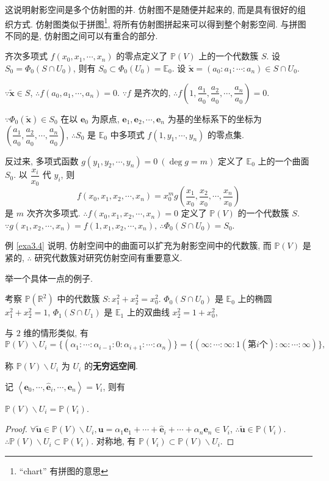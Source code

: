 \documentclass[color=black,device=normal,lang=cn,mode=geye]{elegantnote}
\begin{document}
这说明射影空间是多个仿射图的并. 仿射图不是随便并起来的, 而是具有很好的组织方式. 仿射图类似于拼图\footnote{``chart'' 有拼图的意思}, 将所有仿射图拼起来可以得到整个射影空间. 与拼图不同的是, 仿射图之间可以有重合的部分.
\begin{example}\label{exa3.4}
    齐次多项式 $f(x_0,x_1,\cdots,x_n)$ 的零点定义了 $\mathbb{P}(V)$ 上的一个代数簇 $S$. 设 $S_0=\Phi_0(S\cap U_0)$, 则有 $S_0\subset\Phi_0(U_0)=\mathbb{E}_0$. 设 $\tilde{\boldsymbol{x}}=(a_0:a_1:\cdots:a_n)\in S\cap U_0$.
    
    $\because\tilde{\boldsymbol{x}}\in S$, $\therefore f(a_0,a_1,\cdots,a_n)=0$. $\because f$ 是齐次的, $\therefore f\left(1,\dfrac{a_1}{a_0},\dfrac{a_2}{a_0},\cdots,\dfrac{a_n}{a_0}\right)=0$.
    
    $\because\Phi_0(\tilde{\boldsymbol{x}})\in S_0$ 在以 $\boldsymbol{e}_0$ 为原点, $\boldsymbol{e}_1,\boldsymbol{e}_2,\cdots,\boldsymbol{e}_n$ 为基的坐标系下的坐标为 $\left(\dfrac{a_1}{a_0},\dfrac{a_2}{a_0},\cdots,\dfrac{a_n}{a_0}\right)$, $\therefore S_0$ 是 $\mathbb{E}_0$ 中多项式 $f(1,y_1,\cdots,y_n)$ 的零点集.

    反过来, 多项式函数 $g(y_1,y_2,\cdots,y_n)=0\ (\deg g=m)$ 定义了 $\mathbb{E}_0$ 上的一个曲面 $S_0$. 以 $\dfrac{x_i}{x_0}$ 代 $y_i$, 则
    \[f(x_0,x_1,x_2,\cdots,x_n)=x_0^mg\left(\dfrac{x_1}{x_0},\dfrac{x_2}{x_0},\cdots,\dfrac{x_n}{x_0}\right)\]
    是 $m$ 次齐次多项式. $\therefore f(x_0,x_1,x_2,\cdots,x_n)=0$ 定义了 $\mathbb{P}(V)$ 的一个代数簇 $S$. $\because g(x_1,x_2,\cdots,x_n)=f(1,x_1,x_2,\cdots,x_n)$, $\therefore\Phi_0(S\cap U_0)=S_0$.
\end{example}
例 \ref{exa3.4} 说明, 仿射空间中的曲面可以扩充为射影空间中的代数簇, 而 $\mathbb{P}(V)$ 是紧的, $\therefore$ 研究代数簇对研究仿射空间有重要意义.

举一个具体一点的例子.
\begin{example}
    考察 $\mathbb{P}(\mathbb{R}^2)$ 中的代数簇 $S:x_1^2+x_2^2=x_0^2$. $\Phi_0(S\cap U_0)$ 是 $\mathbb{E}_0$ 上的椭圆 $x_1^2+x_2^2=1$, $\Phi_1(S\cap U_1)$ 是 $\mathbb{E}_1$ 上的双曲线 $x_2^2=1+x_0^2$,
\end{example}

与 $2$ 维的情形类似, 有
\[\mathbb{P}(V)\backslash U_i=\{(\alpha_1:\cdots:\alpha_{i-1}:0:\alpha_{i+1}:\cdots:\alpha_n)\}=\{(\infty:\cdots:\infty:1(\text{第}i\text{个}):\infty:\cdots:\infty)\},\]

称 $\mathbb{P}(V)\backslash U_i$ 为 $U_i$ 的\textbf{无穷远空间}.

记 $\left<\boldsymbol{e}_0,\cdots,\widehat{\boldsymbol{e}}_i,\cdots,\boldsymbol{e}_n\right>=V_i$, 则有
\begin{theorem}
    $\mathbb{P}(V)\backslash U_i=\mathbb{P}(V_i)$.
\end{theorem}
\begin{proof}
    $\forall\tilde{\boldsymbol{u}}\in\mathbb{P}(V)\backslash U_i,\boldsymbol{u}=\alpha_1\boldsymbol{e}_1+\cdots+\hat{\boldsymbol{e}}_i+\cdots+\alpha_n\boldsymbol{e}_n\in V_i$, $\therefore\tilde{\boldsymbol{u}}\in\mathbb{P}(V_i)$. $\therefore\mathbb{P}(V)\backslash U_i\subset\mathbb{P}(V_i)$. 对称地, 有 $\mathbb{P}(V_i)\subset\mathbb{P}(V)\backslash U_i$.
\end{proof}
\end{document}
